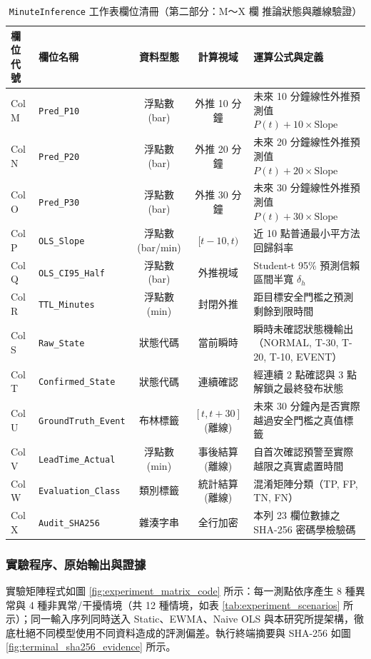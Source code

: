 \documentclass[fontset=none, a4paper, 12pt]{ctexart}
\begin{document}
\begin{table}[H]
    \centering
    \caption{\texttt{MinuteInference} 工作表欄位清冊（第二部分：M～X 欄 推論狀態與離線驗證）}
    \label{tab:minute_inference_pt2}
    \footnotesize
    \begin{tabularx}{\textwidth}{llccX}
        \toprule
        \textbf{欄位代號} & \textbf{欄位名稱} & \textbf{資料型態} & \textbf{計算視域} & \textbf{運算公式與定義} \\
        \midrule
        Col M & \texttt{Pred\_P10} & 浮點數 (bar) & 外推 10 分鐘 & 未來 10 分鐘線性外推預測值 $P(t) + 10 \times \text{Slope}$ \\
        Col N & \texttt{Pred\_P20} & 浮點數 (bar) & 外推 20 分鐘 & 未來 20 分鐘線性外推預測值 $P(t) + 20 \times \text{Slope}$ \\
        Col O & \texttt{Pred\_P30} & 浮點數 (bar) & 外推 30 分鐘 & 未來 30 分鐘線性外推預測值 $P(t) + 30 \times \text{Slope}$ \\
        Col P & \texttt{OLS\_Slope} & 浮點數 (bar/min) & $[t-10, t)$ & 近 10 點普通最小平方法回歸斜率 \\
        Col Q & \texttt{OLS\_CI95\_Half} & 浮點數 (bar) & 外推視域 & Student-t 95\% 預測信賴區間半寬 $\delta_h$ \\
        Col R & \texttt{TTL\_Minutes} & 浮點數 (min) & 封閉外推 & 距目標安全門檻之預測剩餘到限時間 \\
        Col S & \texttt{Raw\_State} & 狀態代碼 & 當前瞬時 & 瞬時未確認狀態機輸出（NORMAL, T-30, T-20, T-10, EVENT） \\
        Col T & \texttt{Confirmed\_State} & 狀態代碼 & 連續確認 & 經連續 2 點確認與 3 點解鎖之最終發布狀態 \\
        Col U & \texttt{GroundTruth\_Event} & 布林標籤 & $[t, t+30]$ (離線) & 未來 30 分鐘內是否實際越過安全門檻之真值標籤 \\
        Col V & \texttt{LeadTime\_Actual} & 浮點數 (min) & 事後結算 (離線) & 自首次確認預警至實際越限之真實處置時間 \\
        Col W & \texttt{Evaluation\_Class} & 類別標籤 & 統計結算 (離線) & 混淆矩陣分類（TP, FP, TN, FN） \\
        Col X & \texttt{Audit\_SHA256} & 雜湊字串 & 全行加密 & 本列 23 欄位數據之 SHA-256 密碼學檢驗碼 \\
        \bottomrule
    \end{tabularx}
\end{table}

\subsubsection{實驗程序、原始輸出與證據}
實驗矩陣程式如圖 \ref{fig:experiment_matrix_code} 所示：每一測點依序產生 8 種異常與 4 種非異常/干擾情境（共 12 種情境，如表 \ref{tab:experiment_scenarios} 所示）；同一輸入序列同時送入 Static、EWMA、Naive OLS 與本研究所提架構，徹底杜絕不同模型使用不同資料造成的評測偏差。執行終端摘要與 SHA-256 如圖 \ref{fig:terminal_sha256_evidence} 所示。
\end{document}
